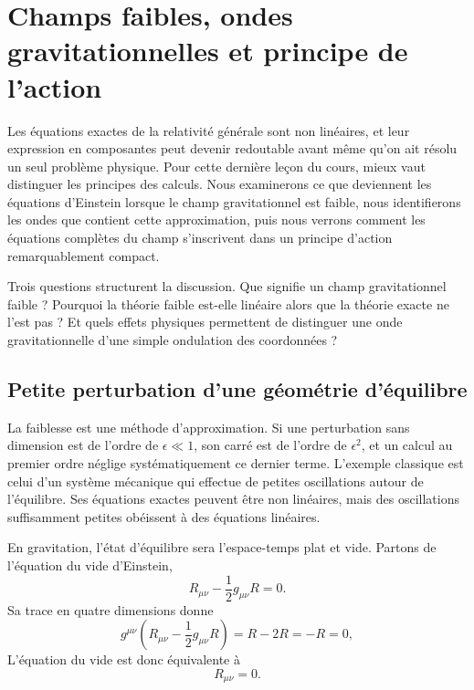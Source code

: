 \chapter{Champs faibles, ondes gravitationnelles et principe de l’action}

Les équations exactes de la relativité générale sont non linéaires, et leur expression en composantes peut devenir redoutable avant même qu’on ait résolu un seul problème physique. Pour cette dernière leçon du cours, mieux vaut distinguer les principes des calculs. Nous examinerons ce que deviennent les équations d’Einstein lorsque le champ gravitationnel est faible, nous identifierons les ondes que contient cette approximation, puis nous verrons comment les équations complètes du champ s’inscrivent dans un principe d’action remarquablement compact.

Trois questions structurent la discussion. Que signifie un champ gravitationnel faible ? Pourquoi la théorie faible est-elle linéaire alors que la théorie exacte ne l’est pas ? Et quels effets physiques permettent de distinguer une onde gravitationnelle d’une simple ondulation des coordonnées ?

\section{Petite perturbation d’une géométrie d’équilibre}

La faiblesse est une méthode d’approximation. Si une perturbation sans dimension est de l’ordre de \(\epsilon\ll1\), son carré est de l’ordre de \(\epsilon^2\), et un calcul au premier ordre néglige systématiquement ce dernier terme. L’exemple classique est celui d’un système mécanique qui effectue de petites oscillations autour de l’équilibre. Ses équations exactes peuvent être non linéaires, mais des oscillations suffisamment petites obéissent à des équations linéaires.

En gravitation, l’état d’équilibre sera l’espace-temps plat et vide. Partons de l’équation du vide d’Einstein,
\begin{equation}
 R_{\mu\nu}-\frac12 g_{\mu\nu}R=0.
 \label{eq:l10-vacuum-einstein}
\end{equation}
Sa trace en quatre dimensions donne
\begin{equation}
 g^{\mu\nu}
 \left(R_{\mu\nu}-\frac12 g_{\mu\nu}R\right)
 =R-2R=-R=0,
\end{equation}
L’équation du vide est donc équivalente à
\begin{equation}
 R_{\mu\nu}=0.
 \label{eq:l10-ricci-flat}
\end{equation}

